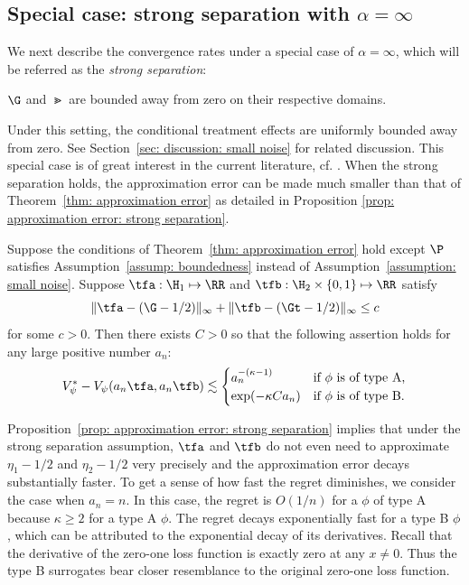 \documentclass[preprint] {imsart}
\begin{document}
 \subsection{Special case: strong separation with $\alpha = \infty$}
We next describe the convergence rates under a special case of  $\alpha=\infty$, which will be referred as the \emph{strong separation}:
\begin{assumption}
\label{assump: boundedness}
$\G$ and $\Gt$ are bounded away from zero on their respective domains.
\end{assumption}
Under this setting, the conditional treatment effects are uniformly bounded away from zero. See Section~\ref{sec: discussion: small noise} for related discussion. This special case is of great interest in the current literature, cf.  \cite{zhao2012, zhao2015, qian2011}.
When the strong separation holds, the approximation error can be made much smaller than that of  Theorem~\ref{thm: approximation error} as detailed in
Proposition \ref{prop: approximation error: strong separation}. 
\begin{proposition}
\label{prop: approximation error: strong separation}
 Suppose the conditions of Theorem~\ref{thm: approximation error} hold except  $\P$ satisfies   Assumption~\ref{assump: boundedness} instead of Assumption~\ref{assumption: small noise}. Suppose $\tfa:\H_1\mapsto\RR$ and $\tfb:\H_2\times\{0,1\}\mapsto\RR$ satisfy
\[
    \|\tfa-(\G-1/2)\|_{\infty}+\|\tfb-(\Gt-1/2)\|_{\infty}\leq c
\]
for some $c>0$.
 Then there exists $C>0$ so that the following assertion holds for any large positive number  $a_n$:
\begin{align*}
 V_\psi^*-V_\psi(a_n\tfa,a_n\tfb)
  \lesssim\begin{cases}
   a_n^{-(\kappa-1)} & \text{if }\phi\text{ is of type A,}\\
 \exp(-\kappa C a_n) & \text{if }\phi\text{ is of type B}.
   \end{cases}
\end{align*}
\end{proposition}

\begin{remark}
Proposition~\ref{prop: approximation error: strong separation} implies that under the strong separation assumption,  $\tfa$ and $\tfb$ do not even need to approximate $\eta_1-1/2$ and $\eta_2-1/2$  very precisely and the approximation error decays substantially faster. To get a sense of how fast the regret diminishes, we consider the case when $a_n=n$. In this case, the regret  is $O(1/n)$ for a $\phi$ of type A because  $\kappa\geq 2$ for a type A $\phi$. The regret decays exponentially fast for a type B $\phi$, which can be attributed to the exponential decay of its  derivatives. 
 Recall that the derivative of the zero-one loss function  is exactly zero at any  $x\neq 0$. Thus  the type B surrogates bear closer resemblance to the original zero-one loss function. 
\end{remark}
\end{document}

